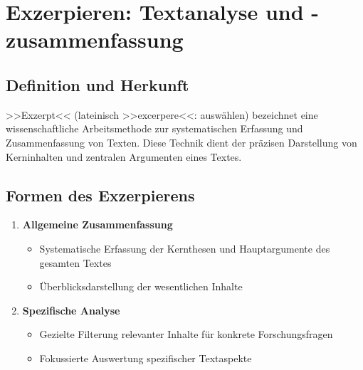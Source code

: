 \documentclass{vorlage-design-main}
\title{}
\author{Jan Unger}
\date{\today}
\begin{document}
\maketitle

\begin{abstract}



\end{abstract}

\section{Exzerpieren: Textanalyse und
-zusammenfassung}\label{exzerpieren-textanalyse-und--zusammenfassung}

\subsection{Definition und Herkunft}\label{definition-und-herkunft}

>>Exzerpt<< (lateinisch >>excerpere<<: auswählen) bezeichnet eine
wissenschaftliche Arbeitsmethode zur systematischen Erfassung und
Zusammenfassung von Texten. Diese Technik dient der präzisen Darstellung
von Kerninhalten und zentralen Argumenten eines Textes.

\subsection{Formen des Exzerpierens}\label{formen-des-exzerpierens}

\begin{enumerate}
\def\labelenumi{\arabic{enumi}.}

\item
  \textbf{Allgemeine Zusammenfassung}

  \begin{itemize}
  
  \item
    Systematische Erfassung der Kernthesen und Hauptargumente des
    gesamten Textes
  \item
    Überblicksdarstellung der wesentlichen Inhalte
  \end{itemize}
\item
  \textbf{Spezifische Analyse}

  \begin{itemize}
  
  \item
    Gezielte Filterung relevanter Inhalte für konkrete Forschungsfragen
  \item
    Fokussierte Auswertung spezifischer Textaspekte
  \end{itemize}
\end{enumerate}
\end{document}

